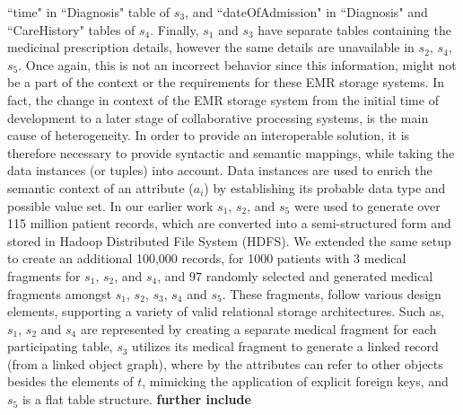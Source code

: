 ``time" in ``Diagnosis" table of $s_3$, and  ``dateOfAdmission" in ``Diagnosis" and ``CareHistory" tables of $s_4$.
Finally, $s_1$ and $s_3$ have separate tables containing the medicinal prescription details, however the same details are unavailable in $s_2$, $s_4$, $s_5$. Once again, this is not an incorrect behavior since this information, might not be a part of the context or the requirements for these EMR storage systems.
In fact, the change in context of the EMR storage system from the initial time of development to a later stage of collaborative processing systems, is the main cause of heterogeneity.
In order to provide an interoperable solution, it is therefore necessary to provide syntactic and semantic mappings, while taking the data instances (or tuples) into account. Data instances are used to enrich the semantic context of an attribute ($a_i$) by establishing its probable data type and possible value set. 
In our earlier work \cite{Satti2020} $s_1$, $s_2$, and $s_5$ were used to generate over 115 million patient records, which are converted into a semi-structured form and stored in Hadoop Distributed File System (HDFS). We extended the same setup to create an additional 100,000 records, for 1000 patients with 3 medical fragments for $s_1$, $s_2$, and $s_4$, and 97 randomly selected and generated medical fragments amongst $s_1$, $s_2$, $s_3$, $s_4$ and $s_5$. These fragments, follow various design elements, supporting a variety of valid relational storage architectures. Such as, $s_1$, $s_2$ and $s_4$ are represented by creating a separate medical fragment for each participating table, $s_3$ utilizes its medical fragment to generate a linked record (from a linked object graph), where by the attributes can refer to other objects besides the elements of $t$, mimicking the application of explicit foreign keys, and $s_5$ is a flat table structure. \textbf{further include}

